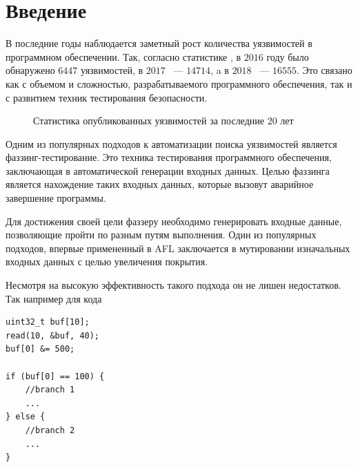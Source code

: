 \chapter*{Введение}


В последние годы наблюдается заметный рост количества уязвимостей в программном обеспечении. Так, согласно статистике \cite{CVEstats}, в $2016$ году было обнаружено $6447$ уязвимостей, в $2017$ ~---  $14714$, a в $2018$ ~--- $16555$. Это связано как с объемом и сложностью, разрабатываемого программного обеспечения, так и с развитием техник тестирования безопасности.

\begin{figure}[h]
    \caption{Статистика опубликованных уязвимостей за последние $20$ лет}
    \label{fig:image}
\end{figure}

Одним из популярных подходов к автоматизации поиска уязвимостей является фаззинг-тестирование. Это
техника тестирования программного обеспечения, заключающая в автоматической генерации входных данных. Целью фаззинга является нахождение таких входных данных, которые вызовут аварийное завершение программы.

Для достижения своей цели фаззеру необходимо генерировать входные данные, позволяющие пройти по разным путям выполнения. Один из популярных подходов, впервые примененный в AFL \cite{AFL} заключается в мутировании изначальных входных данных с целью увеличения покрытия.

Несмотря на высокую эффективность такого подхода он не лишен недостатков. Так например для кода
\begin{lstlisting}[environoment=C_LANG, caption=example.c, label={lst:example1}]
uint32_t buf[10];
read(10, &buf, 40);
buf[0] &= 500;

if (buf[0] == 100) {
    //branch 1
    ...
} else {
    //branch 2
    ...
}
\end{lstlisting}

